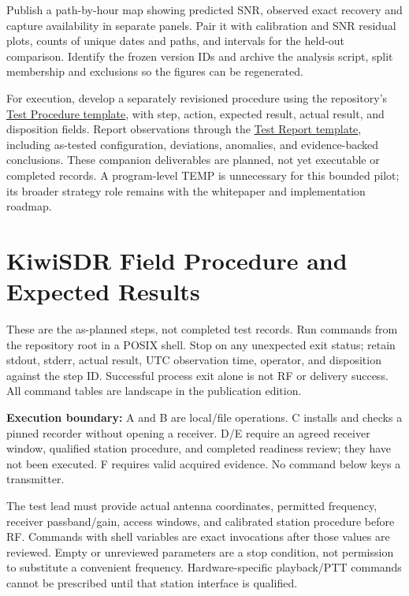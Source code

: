 \documentclass[11pt,a4paper]{article}
\begin{document}
Publish a path-by-hour map showing predicted SNR, observed exact recovery and capture availability in separate panels. Pair it with calibration and SNR residual plots, counts of unique dates and paths, and intervals for the held-out comparison. Identify the frozen version IDs and archive the analysis script, split membership and exclusions so the figures can be regenerated.


For execution, develop a separately revisioned procedure using the repository's \href{https://github.com/8r4n/acq-latex-templates/blob/fef160e37542fd7bc8e62de81404a83b8634a396/templates/engineering/verification/test-procedure/main.tex}{Test Procedure template}, with step, action, expected result, actual result, and disposition fields. Report observations through the \href{https://github.com/8r4n/acq-latex-templates/blob/fef160e37542fd7bc8e62de81404a83b8634a396/templates/engineering/verification/test-report/main.tex}{Test Report template}, including as-tested configuration, deviations, anomalies, and evidence-backed conclusions. These companion deliverables are planned, not yet executable or completed records. A program-level TEMP is unnecessary for this bounded pilot; its broader strategy role remains with the whitepaper and implementation roadmap.


\appendix

\section{KiwiSDR Field Procedure and Expected Results}
\label{tp:procedure}

These are the as-planned steps, not completed test records. Run commands from the repository root in a POSIX shell. Stop on any unexpected exit status; retain stdout, stderr, actual result, UTC observation time, operator, and disposition against the step ID. Successful process exit alone is not RF or delivery success. All command tables are landscape in the publication edition.

\textbf{Execution boundary:} A and B are local/file operations. C installs and checks a pinned recorder without opening a receiver. D/E require an agreed receiver window, qualified station procedure, and completed readiness review; they have not been executed. F requires valid acquired evidence. No command below keys a transmitter.

The test lead must provide actual antenna coordinates, permitted frequency, receiver passband/gain, access windows, and calibrated station procedure before RF. Commands with shell variables are exact invocations after those values are reviewed. Empty or unreviewed parameters are a stop condition, not permission to substitute a convenient frequency. Hardware-specific playback/PTT commands cannot be prescribed until that station interface is qualified.
\end{document}

